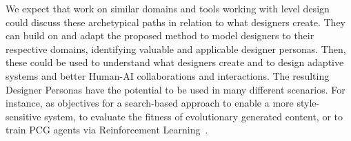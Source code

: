 

We expect that work on similar domains and tools working with level design could discuss these archetypical paths in relation to what designers create. They can build on and adapt the proposed method to model designers to their respective domains, identifying valuable and applicable designer personas. Then, these could be used to understand what designers create and to design adaptive systems and better Human-AI collaborations and interactions. The resulting Designer Personas have the potential to be used in many different scenarios. For instance, as objectives for a search-based approach to enable a more style-sensitive system, to evaluate the fitness of evolutionary generated content, or to train PCG agents via Reinforcement Learning~.




